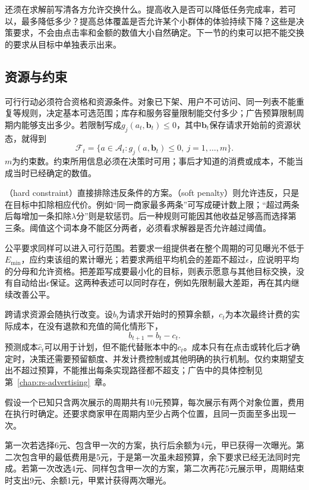 还须在求解前写清各方允许交换什么。提高收入是否可以降低任务完成率，若可以，最多降低多少？提高总体覆盖是否允许某个小群体的体验持续下降？这些是决策要求，不会由点击率和金额的数值大小自然确定。下一节的约束可以把不能交换的要求从目标中单独表示出来。

\subsection{资源与约束}
\label{sec:rs-decision-resources}

可行行动必须符合资格和资源条件。对象已下架、用户不可访问、同一列表不能重复等规则，决定基本可选范围；库存和服务容量限制能交付多少；广告预算限制周期内能够支出多少。若限制写成$g_j(a_t,\bm{b}_t)\leq0$，其中$\bm{b}_t$保存请求开始前的资源状态，就得到
\begin{equation}
 \mathcal{F}_t=
 \{a\in\mathcal{A}_t:
   g_j(a,\bm{b}_t)\leq0,\ j=1,\ldots,m\}.
 \label{eq:rs-feasible-actions}
\end{equation}
$m$为约束数。约束所用信息必须在决策时可用；事后才知道的消费或成本，不能当成当时已经确定的数值。

（hard constraint）直接排除违反条件的方案。（soft penalty）则允许违反，只是在目标中扣除相应代价。例如“同一商家最多两条”可写成硬计数上限；“超过两条后每增加一条扣除$\lambda$分”则是软惩罚。后一种规则可能因其他收益足够高而选择第三条。阈值这个词本身不能区分两者，必须看求解器是否允许越过阈值。

公平要求同样可以进入可行范围。若要求一组提供者在整个周期的可见曝光不低于$E_{\min}$，应约束该组的累计曝光；若要求两组平均机会的差距不超过$\epsilon$，应说明平均的分母和允许资格。把差距写成要最小化的目标，则表示愿意与其他目标交换，没有自动给出$\epsilon$保证。这两种表述可以同时存在，例如先限制最大差距，再在其内继续改善公平。

跨请求资源会随执行改变。设$b_t$为请求开始时的预算余额，$c_t$为本次最终计费的实际成本，在没有退款和充值的简化情形下，
\[
 b_{t+1}=b_t-c_t.
\]
预测成本$\widehat c_t$可以用于计划，但不能代替账本中的$c_t$。成本只有在点击或转化后才确定时，决策还需要预留额度、并发计费控制或其他明确的执行机制。仅约束期望支出不超过预算，不能推出每条实现路径都不超支；广告中的具体控制见第~\ref{chap:rs-advertising}~章。

\begin{example}[当前可行与周期可行]
 \label{ex:rs-two-request-budget}
 假设一个已知只含两次展示的周期共有10元预算，每次展示有两个对象位置，费用在执行时确定。还要求商家甲在周期内至少占两个位置，且同一页面至多出现一次。

 第一次若选择6元、包含甲一次的方案，执行后余额为4元，甲已获得一次曝光。第二次包含甲的最低费用是5元，于是第一次虽未超预算，余下要求已经无法同时完成。若第一次改选4元、同样包含甲一次的方案，第二次再花5元展示甲，周期结束时支出9元、余额1元，甲累计获得两次曝光。
\end{example}

